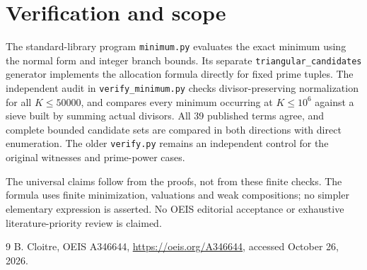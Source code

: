 \documentclass[10pt]{article}
\begin{document}
\section{Verification and scope}
The standard-library program \texttt{minimum.py} evaluates the exact
minimum using the normal form and integer branch bounds. Its separate
\texttt{triangular\_candidates} generator implements the allocation
formula directly for fixed prime tuples. The independent audit in
\texttt{verify\_minimum.py} checks divisor-preserving normalization for
all $K\le50000$, and compares every minimum occurring at $K\le10^6$
against a sieve built by summing actual divisors. All 39 published terms
agree, and complete bounded candidate sets are compared in both
directions with direct enumeration. The older \texttt{verify.py} remains
an independent control for the original witnesses and prime-power cases.

The universal claims follow from the proofs, not from these finite
checks. The formula uses finite minimization, valuations and weak
compositions; no simpler elementary expression is asserted. No OEIS
editorial acceptance or exhaustive literature-priority review is claimed.

\begin{thebibliography}{9}
 B. Cloitre, OEIS A346644,
\url{https://oeis.org/A346644}, accessed October 26, 2026.
\end{thebibliography}
\end{document}
